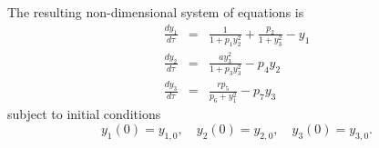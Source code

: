 \documentclass[10pt,letterpaper]{article}
\begin{document}
\bigskip
The resulting non-dimensional system of equations is
\begin{eqnarray}
\frac{dy_1}{d\tau} &=& \frac{1}{1 + p_1 y_2^2} + \frac{p_2}{1 + y_3^2} - y_1  \label{nondim_de_one} \\
\frac{dy_2}{d\tau} &=& \frac{a y_3^2}{1 + p_3 y_3^2} - p_4 y_2 \label{nondim_de_two} \\
\frac{dy_3}{d\tau} &=& \frac{r p_5}{p_6 + y_1^2} - p_7 y_3 \label{nondim_de_three}
\end{eqnarray}
subject to initial conditions
\begin{equation}
y_1(0) = y_{1,0}, \quad y_2(0) = y_{2,0}, \quad y_3(0) = y_{3,0}.
\end{equation}



\end{document}
